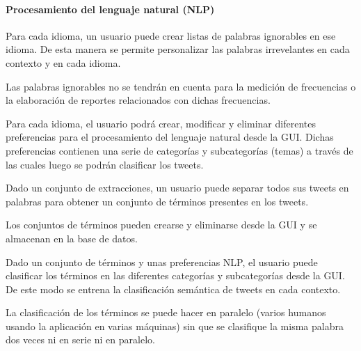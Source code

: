 \begin{functional}
\paragraph{Procesamiento del lenguaje natural (NLP)}
\item Para cada idioma, un usuario puede crear listas de palabras ignorables en ese idioma. De esta manera se permite personalizar las palabras irrevelantes en cada contexto y en cada idioma.
\item Las palabras ignorables no se tendrán en cuenta para la medición de frecuencias o la elaboración de reportes relacionados con dichas frecuencias.
\item Para cada idioma, el usuario podrá crear, modificar y eliminar diferentes preferencias para el procesamiento del lenguaje natural desde la GUI. Dichas preferencias contienen una serie de categorías y subcategorías (temas) a través de las cuales luego se podrán clasificar los tweets.
\item Dado un conjunto de extracciones, un usuario puede separar todos sus tweets en palabras para obtener un conjunto de términos presentes en los tweets.
\item Los conjuntos de términos pueden crearse y eliminarse desde la GUI y se almacenan en la base de datos.
\item Dado un conjunto de términos y unas preferencias NLP, el usuario puede clasificar los términos en las diferentes categorías y subcategorías desde la GUI. De este modo se entrena la clasificación semántica de tweets en cada contexto.
\item La clasificación de los términos se puede hacer en paralelo (varios humanos usando la aplicación en varias máquinas) sin que se clasifique la misma palabra dos veces ni en serie ni en paralelo.


\end{functional}
